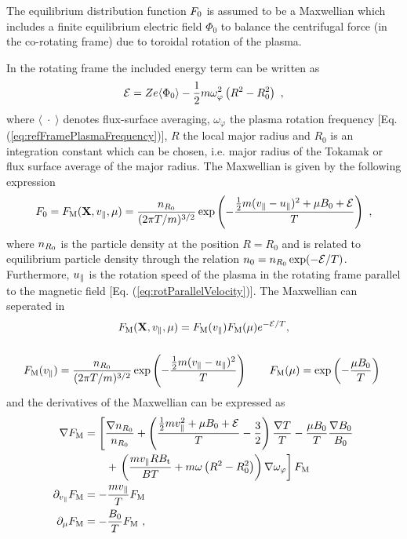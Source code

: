 The equilibrium distribution function $F_0$ is assumed to be a Maxwellian which includes a finite equilibrium electric field $\Phi_0$ to balance the centrifugal force (in the co-rotating frame) due to toroidal rotation of the plasma. 

In the rotating frame the included energy term can be written as 
\begin{gather}
	\mathcal{E} = Z e \langle \Phi_0 \rangle - \frac{1}{2} m \omega_\varphi^2 \left(R^2 - R_0^2\right)~,
	\label{eq:rotEnergy}
\end{gather}
where $\langle\;\cdot\;\rangle$ denotes flux-surface averaging, $\omega_\varphi$ the plasma rotation frequency [Eq. (\ref{eq:refFramePlasmaFrequency})], $R$ the local major radius and $R_0$ is an integration constant which can be chosen, i.e. major radius of the Tokamak or flux surface average of the major radius. The Maxwellian is given by the following expression
\begin{gather}
	F_0 = F_\mathrm{M}(\boldsymbol{\mathbf{X}}, v_\parallel, \mu) = \frac{n_{R_0}}{(2\pi T/m)^{3/2}}\exp\left(-\frac{\frac{1}{2} m (v_\parallel - u_\parallel)^2 + \mu B_0 + \mathcal{E}}{T}\right)~,
	\label{eq:maxwellian}
\end{gather}   
where $n_{R_0}$ is the particle density at the position $R = R_0$ and is related to equilibrium particle density through the relation $n_0 = n_{R_0} \exp(-\mathcal{E}/T)$. \cite{Peeters2009B} Furthermore, $u_\parallel$ is the rotation speed of the plasma in the rotating frame parallel to the magnetic field [Eq. (\ref{eq:rotParallelVelocity})]. The Maxwellian can seperated in 
\begin{gather}
	F_\mathrm{M}(\boldsymbol{\mathbf{X}}, v_\parallel, \mu) = F_\mathrm{M}(v_\parallel) F_\mathrm{M}(\mu) e^{-\mathcal{E}/T} , \\[0,5cm]
	F_\mathrm{M}(v_\parallel) = \frac{n_{R_0}}{(2\pi T/m)^{3/2}} \exp\left(-\frac{\frac{1}{2} m (v_\parallel - u_\parallel)^2}{T}\right) \qquad F_\mathrm{M}(\mu) = \exp\left(-\frac{\mu B_0}{T}\right) ~
	\label{eq:maxwellianSeperated}
\end{gather}
and the derivatives of the Maxwellian can be expressed as 
\begin{gather}
	\begin{aligned}
		\nabla F_\mathrm{M}           &= \left[\frac{\nabla n_{R_0}}{n_{R_0}} + \left(\frac{\frac{1}{2} m v_\parallel^2 + \mu B_0 + \mathcal{E}}{T} - \frac{3}{2}\right)\frac{\nabla T}{T} - \frac{\mu B_0}{T} \frac{\nabla B_0}{B_0} \right. \\ 
		&\qquad + \left. \left(\frac{m v_\parallel R B_\mathrm{t}}{BT} + m\omega \left(R^2 - R_0^2\right)\right) \nabla \omega_\varphi\right] F_\mathrm{M} \\
		\partial_{v_\parallel} F_\mathrm{M} &= - \frac{m v_\parallel}{T} F_\mathrm{M} \\
		\partial_\mu F_\mathrm{M}     &= - \frac{B_0}{T} F_\mathrm{M} ~,  
	\end{aligned}
	\label{eq:derivativeMaxwellian}
\end{gather} 
